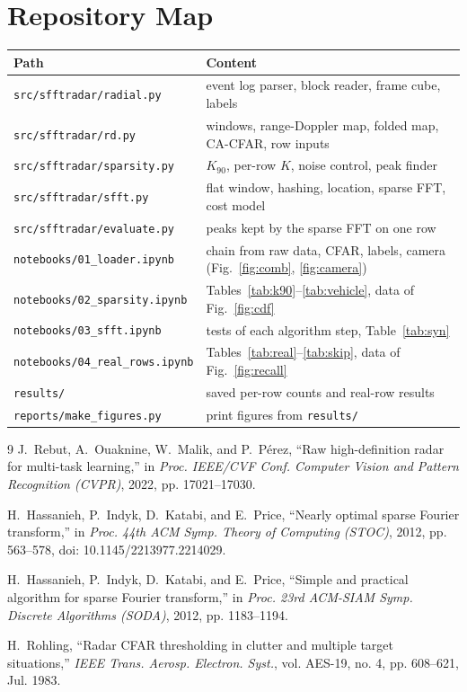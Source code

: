 \documentclass[10pt,a4paper]{article}
\begin{document}
\section{Repository Map}
\begin{table}[h]
\centering
\begin{tabular}{ll}
\toprule
Path & Content \\
\midrule
\texttt{src/sfftradar/radial.py} & event log parser, block reader, frame cube, labels \\
\texttt{src/sfftradar/rd.py} & windows, range-Doppler map, folded map, CA-CFAR, row inputs \\
\texttt{src/sfftradar/sparsity.py} & $K_{90}$, per-row $K$, noise control, peak finder \\
\texttt{src/sfftradar/sfft.py} & flat window, hashing, location, sparse FFT, cost model \\
\texttt{src/sfftradar/evaluate.py} & peaks kept by the sparse FFT on one row \\
\texttt{notebooks/01\_loader.ipynb} & chain from raw data, CFAR, labels, camera (Fig.~\ref{fig:comb}, \ref{fig:camera}) \\
\texttt{notebooks/02\_sparsity.ipynb} & Tables~\ref{tab:k90}--\ref{tab:vehicle}, data of Fig.~\ref{fig:cdf} \\
\texttt{notebooks/03\_sfft.ipynb} & tests of each algorithm step, Table~\ref{tab:syn} \\
\texttt{notebooks/04\_real\_rows.ipynb} & Tables~\ref{tab:real}--\ref{tab:skip}, data of Fig.~\ref{fig:recall} \\
\texttt{results/} & saved per-row counts and real-row results \\
\texttt{reports/make\_figures.py} & print figures from \texttt{results/} \\
\bottomrule
\end{tabular}
\end{table}

\begin{thebibliography}{9}
J.~Rebut, A.~Ouaknine, W.~Malik, and P.~P\'erez, ``Raw high-definition radar for multi-task learning,'' in \emph{Proc. IEEE/CVF Conf. Computer Vision and Pattern Recognition (CVPR)}, 2022, pp. 17021--17030.

H.~Hassanieh, P.~Indyk, D.~Katabi, and E.~Price, ``Nearly optimal sparse Fourier transform,'' in \emph{Proc. 44th ACM Symp. Theory of Computing (STOC)}, 2012, pp. 563--578, doi: 10.1145/2213977.2214029.

H.~Hassanieh, P.~Indyk, D.~Katabi, and E.~Price, ``Simple and practical algorithm for sparse Fourier transform,'' in \emph{Proc. 23rd ACM-SIAM Symp. Discrete Algorithms (SODA)}, 2012, pp. 1183--1194.

H.~Rohling, ``Radar CFAR thresholding in clutter and multiple target situations,'' \emph{IEEE Trans. Aerosp. Electron. Syst.}, vol. AES-19, no. 4, pp. 608--621, Jul. 1983.
\end{thebibliography}
\end{document}
